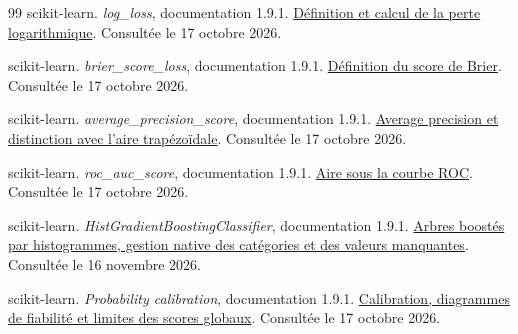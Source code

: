 \begin{thebibliography}{99}
scikit-learn. \textit{log\_loss}, documentation 1.9.1.
\href{https://scikit-learn.org/stable/modules/generated/sklearn.metrics.log_loss.html}{Définition et calcul de la perte logarithmique}.
Consultée le 17 octobre 2026.

scikit-learn. \textit{brier\_score\_loss}, documentation 1.9.1.
\href{https://scikit-learn.org/stable/modules/generated/sklearn.metrics.brier_score_loss.html}{Définition du score de Brier}.
Consultée le 17 octobre 2026.

scikit-learn. \textit{average\_precision\_score}, documentation 1.9.1.
\href{https://scikit-learn.org/stable/modules/generated/sklearn.metrics.average_precision_score.html}{Average precision et distinction avec l'aire trapézoïdale}.
Consultée le 17 octobre 2026.

scikit-learn. \textit{roc\_auc\_score}, documentation 1.9.1.
\href{https://scikit-learn.org/stable/modules/generated/sklearn.metrics.roc_auc_score.html}{Aire sous la courbe ROC}.
Consultée le 17 octobre 2026.

scikit-learn. \textit{HistGradientBoostingClassifier}, documentation 1.9.1.
\href{https://scikit-learn.org/stable/modules/generated/sklearn.ensemble.HistGradientBoostingClassifier.html}{Arbres boostés par histogrammes, gestion native des catégories et des valeurs manquantes}.
Consultée le 16 novembre 2026.

scikit-learn. \textit{Probability calibration}, documentation 1.9.1.
\href{https://scikit-learn.org/stable/modules/calibration.html}{Calibration, diagrammes de fiabilité et limites des scores globaux}.
Consultée le 17 octobre 2026.

\end{thebibliography}
